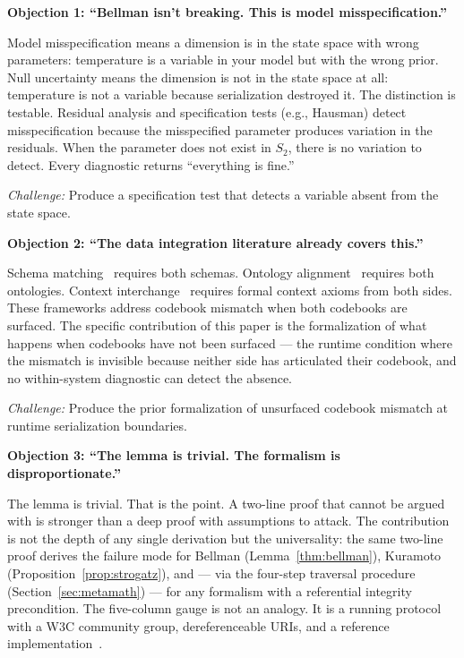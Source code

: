 \documentclass[11pt,a4paper]{article}
\begin{document}
\textbf{Objection 1: ``Bellman isn't breaking. This is model 
misspecification.''}

Model misspecification means a dimension is in the state space 
with wrong parameters: temperature is a variable in your model but 
with the wrong prior. Null uncertainty means the dimension is not 
in the state space at all: temperature is not a variable because 
serialization destroyed it. The distinction is testable. Residual 
analysis and specification tests (e.g., Hausman) detect 
misspecification because the misspecified parameter produces 
variation in the residuals. When the parameter does not exist in 
$S_2$, there is no variation to detect. Every diagnostic returns 
``everything is fine.'' 

\emph{Challenge:} Produce a specification test that detects a 
variable absent from the state space.

\textbf{Objection 2: ``The data integration literature already 
covers this.''}

Schema matching~\cite{rahm2001} requires both schemas. Ontology 
alignment~\cite{euzenat2007} requires both ontologies. Context 
interchange~\cite{goh1999} requires formal context axioms from 
both sides. These frameworks address codebook mismatch when both 
codebooks are surfaced. The specific contribution of this paper is 
the formalization of what happens when codebooks have not been 
surfaced --- the runtime condition where the mismatch is invisible 
because neither side has articulated their codebook, and no 
within-system diagnostic can detect the absence.

\emph{Challenge:} Produce the prior formalization of unsurfaced 
codebook mismatch at runtime serialization boundaries.

\textbf{Objection 3: ``The lemma is trivial. The formalism is 
disproportionate.''}

The lemma is trivial. That is the point. A two-line proof that 
cannot be argued with is stronger than a deep proof with 
assumptions to attack. The contribution is not the depth of any 
single derivation but the universality: the same two-line proof 
derives the failure mode for Bellman (Lemma~\ref{thm:bellman}), 
Kuramoto (Proposition~\ref{prop:strogatz}), and --- via the 
four-step traversal procedure (Section~\ref{sec:metamath}) --- for 
any formalism with a referential integrity precondition. The 
five-column gauge is not an analogy. It is a running protocol 
with a W3C community group, dereferenceable URIs, and a reference 
implementation~\cite{itelman2026lh}.
\end{document}
